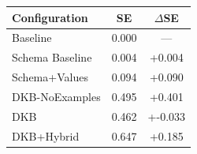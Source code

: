 \begin{tabular}{lcc}
\toprule
Configuration & SE & $\Delta$SE \\
\midrule
Baseline & 0.000 & — \\
Schema Baseline & 0.004 & +0.004 \\
Schema+Values & 0.094 & +0.090 \\
DKB-NoExamples & 0.495 & +0.401 \\
DKB & 0.462 & +-0.033 \\
DKB+Hybrid & 0.647 & +0.185 \\
\bottomrule
\end{tabular}
